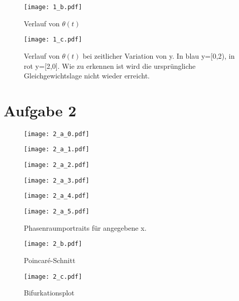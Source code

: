\documentclass[paper=a4, ngerman]{scrartcl}
\begin{document}
\begin{figure}[htbp]
	\centering
	\texttt{[image: 1\_b.pdf]}
	\caption{Verlauf von $\theta(t)$}
	\label{fig:1b}
\end{figure}

\begin{figure}[htbp]
	\centering
	\texttt{[image: 1\_c.pdf]}
	\caption{Verlauf von $\theta(t)$ bei zeitlicher Variation von y. In blau y=[0,2), in rot y=[2,0]. Wie zu erkennen ist wird die ursprüngliche  Gleichgewichtslage nicht wieder erreicht.}
	\label{fig:1c}
\end{figure}


\section*{Aufgabe 2}
\begin{figure}[htbp]
    \centering
    \begin{minipage}{.49\linewidth}
        \centering
        \texttt{[image: 2\_a\_0.pdf]}
        \caption{}
        \label{fig:}
    \end{minipage}
    \begin{minipage}{.49\linewidth}
        \centering
        \texttt{[image: 2\_a\_1.pdf]}
        \caption{}
        \label{fig:}
    \end{minipage}
        \begin{minipage}{.49\linewidth}
        \centering
        \texttt{[image: 2\_a\_2.pdf]}
        \caption{}
        \label{fig:}
    \end{minipage}
    \begin{minipage}{.49\linewidth}
        \centering
        \texttt{[image: 2\_a\_3.pdf]}
        \caption{}
        \label{fig:}
    \end{minipage}
    \begin{minipage}{.49\linewidth}
        \centering
        \texttt{[image: 2\_a\_4.pdf]}
        \caption{}
        \label{fig:}
    \end{minipage}
    \begin{minipage}{.49\linewidth}
        \centering
        \texttt{[image: 2\_a\_5.pdf]}
        \caption{}
        \label{fig:}
    \end{minipage}
    \caption{Phasenraumportraits für angegebene x.}
\end{figure} 

\begin{figure}[htbp]
	\centering
	\texttt{[image: 2\_b.pdf]}
	\caption{Poincaré-Schnitt}
	\label{fig:poin}
\end{figure}

\begin{figure}[htbp]
	\centering
	\texttt{[image: 2\_c.pdf]}
	\caption{Bifurkationsplot}
	\label{fig:label}
\end{figure}
\end{document}
